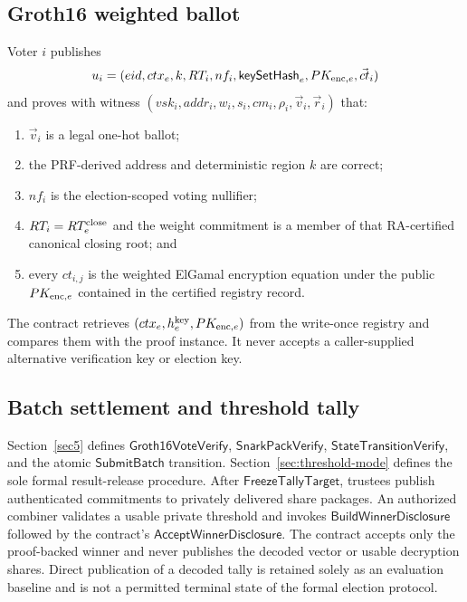 \documentclass[pdflatex,sn-mathphys-num]{sn-jnl}%
\theoremstyle{thmstyleone}%
\theoremstyle{thmstyletwo}%
\theoremstyle{thmstylethree}%
\begin{document}
\subsection{Groth16 weighted ballot}\label{subsec:zk-voting}
Voter $i$ publishes
\[
 u_i=(eid,ctx_e,k,RT_i,nf_i,\mathsf{keySetHash}_e,
       PK_{{\rm enc},e},\vec{ct}_i)
\]
and proves with witness
$(vsk_i,addr_i,w_i,s_i,cm_i,\rho_i,\vec v_i,\vec r_i)$ that:
\begin{enumerate}
 \item $\vec v_i$ is a legal one-hot ballot;
 \item the PRF-derived address and deterministic region $k$ are correct;
 \item $nf_i$ is the election-scoped voting nullifier;
 \item $RT_i=RT_e^{\rm close}$ and the weight commitment is a member of that
       RA-certified canonical closing root; and
 \item every $ct_{i,j}$ is the weighted ElGamal encryption equation under the
       public $PK_{{\rm enc},e}$ contained in the certified registry record.
\end{enumerate}
The contract retrieves $(ctx_e,h_e^{\rm key},PK_{{\rm enc},e})$ from the
write-once registry and compares them with the proof instance.  It never
accepts a caller-supplied alternative verification key or election key.

\subsection{Batch settlement and threshold tally}\label{subsec:vv-dk-tally}
Section~\ref{sec5} defines $\mathsf{Groth16VoteVerify}$,
$\mathsf{SnarkPackVerify}$, $\mathsf{StateTransitionVerify}$, and the atomic
$\mathsf{SubmitBatch}$ transition.  Section~\ref{sec:threshold-mode} defines
the sole formal result-release procedure.  After
$\mathsf{FreezeTallyTarget}$, trustees publish authenticated commitments to
privately delivered share packages.  An authorized combiner validates a
usable private threshold and invokes
$\mathsf{BuildWinnerDisclosure}$ followed by the contract's
$\mathsf{AcceptWinnerDisclosure}$.  The contract accepts only the proof-backed
winner and never publishes the decoded vector or usable decryption shares.
Direct publication of a decoded tally is retained solely as an evaluation
baseline and is not a permitted terminal state of the formal election
protocol.
\end{document}
